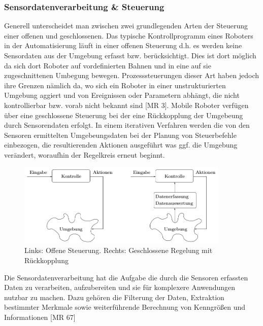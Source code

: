 \subsubsection{Sensordatenverarbeitung \& Steuerung}
\color{process}
Generell unterscheidet man zwischen zwei grundlegenden Arten der Steuerung einer offenen und geschlossenen. Das typische Kontrollprogramm eines Roboters in der Automatisierung läuft in einer offenen Steuerung d.h. es werden keine Sensordaten aus der Umgebung erfasst bzw. berücksichtigt. Dies ist dort möglich da 
sich dort Roboter auf vordefinierten Bahnen und in eine auf sie zugeschnittenen Umbegung bewegen.
\newline
Prozesssteuerungen dieser Art haben jedoch ihre Grenzen nämlich da, wo sich ein Roboter in einer unstrukturierten Umgebung aggiert und von Ereignissen oder Parametern abhängt, die nicht kontrollierbar bzw. vorab nicht bekannt sind [MR 3].
Mobile Roboter verfügen über eine geschlossene Steuerung bei der eine Rückkopplung der Umgebeung durch Sensorendaten erfolgt. In einem iterativen Verfahren werden die von den Sensoren ermittelten Umgebeungsdaten bei der Planung von Steuerbefehle einbezogen, die resultierenden Aktionen ausgeführt was ggf. die Umgebung verändert, woraufhin der Regelkreis erneut beginnt.
\begin{figure}[ht]
	\centering
		\includegraphics[width=0.90\textwidth]{images/technische_grundlagen/Steuerungsarten.png}
		\caption[Vergleich Offene und Geschlossene Steuerung]{Links: Offene Steuerung. Rechts: Geschlossene Regelung mit Rückkopplung}
	\label{fig:<Sprungmakre>}
\end{figure}
\newline
Die Sensordatenverarbeitung hat die Aufgabe die durch die Sensoren erfassten Daten zu verarbeiten, aufzubereiten und sie für komplexere Anwendungen nutzbar zu machen. Dazu gehören die Filterung der Daten, Extraktion bestimmter Merkmale sowie weiterführende Berechnung von Kenngrößen und Informationen [MR 67]

